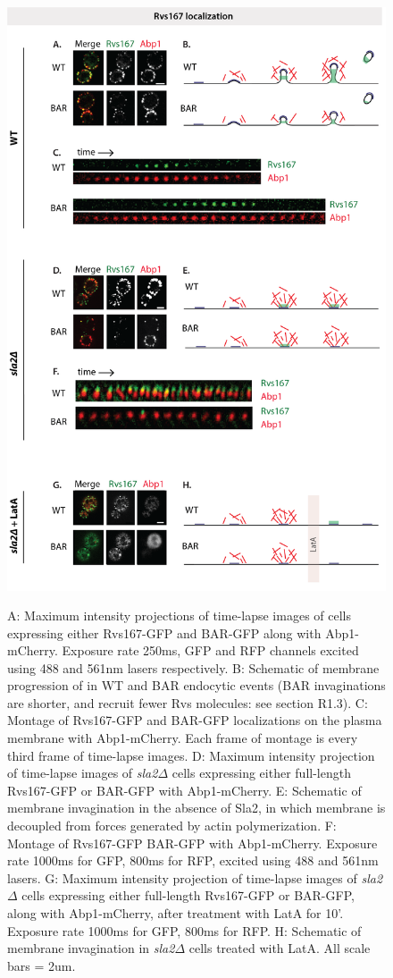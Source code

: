 	\begin{figure}
	\centering
	\includegraphics[width=18cm,height=18cm,keepaspectratio]{figures/results_final/sla2_del_final6}
	\caption [Localization of Rvs167 and BAR with and without membrane curvature]
	{A: Maximum intensity projections of time-lapse images of cells expressing either Rvs167-GFP and BAR-GFP along with Abp1-mCherry. Exposure rate 250ms, GFP and RFP channels excited using 488 and 561nm lasers respectively. B: Schematic of membrane progression of in WT and BAR endocytic events (BAR invaginations are shorter, and recruit fewer Rvs molecules: see section R1.3).
	C: Montage of Rvs167-GFP and BAR-GFP localizations on the plasma membrane with Abp1-mCherry. Each frame of montage is every third frame of time-lapse images. 
	D: Maximum intensity projection of time-lapse images of \textit{sla2$\Delta$} cells expressing either full-length Rvs167-GFP or BAR-GFP with Abp1-mCherry. 
	E: Schematic of membrane invagination in the absence of Sla2, in which membrane is decoupled from forces generated by actin polymerization. F: Montage of Rvs167-GFP BAR-GFP with Abp1-mCherry. Exposure rate 1000ms for GFP, 800ms for RFP, excited using 488 and 561nm lasers. 
	G: Maximum intensity projection of time-lapse images of \textit{sla2$\Delta$} cells expressing either full-length Rvs167-GFP or BAR-GFP, along with Abp1-mCherry, after treatment with LatA for 10’. Exposure rate 1000ms for GFP, 800ms for RFP. H: Schematic of membrane invagination in \textit{sla2$\Delta$} cells treated with LatA. 
	All scale bars = 2um.
	\label{fig2_sla2del}}
	\end{figure}

